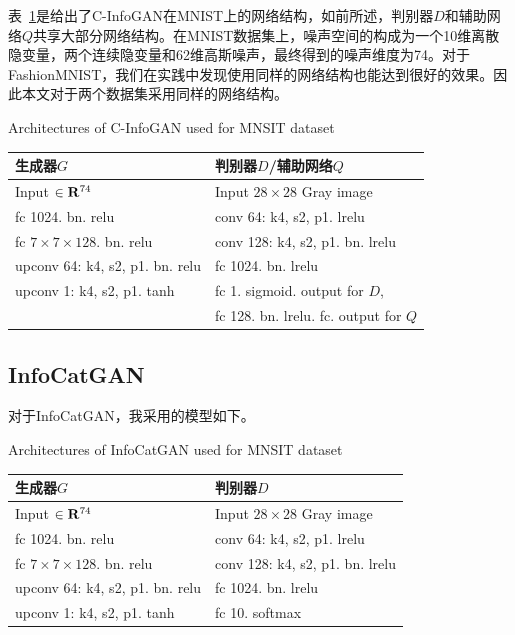 表~\ref{tab:m-cig-netarch}是给出了C-InfoGAN在MNIST上的网络结构，如前所述，判别器$D$和辅助网络$Q$共享大部分网络结构。在MNIST数据集上，噪声空间的构成为一个10维离散隐变量，两个连续隐变量和62维高斯噪声，最终得到的噪声维度为74。对于FashionMNIST，我们在实践中发现使用同样的网络结构也能达到很好的效果。因此本文对于两个数据集采用同样的网络结构。
\begin{table}
  \centering
  {Architectures of C-InfoGAN used for MNSIT dataset}
  \begin{tabular}{l|l}
    \hline
    \textbf{生成器$G$}               & \textbf{判别器$D$/辅助网络$Q$} \\ \hline
    Input $\in \mathbf{R}^{74}$          & Input $28\times 28$ Gray image \\ \hline
    fc 1024. bn. relu                & conv 64: k4, s2, p1. lrelu  \\ \hline
    fc $7\times7\times128$. bn. relu & conv 128: k4, s2, p1. bn. lrelu \\ \hline
    upconv 64: k4, s2, p1. bn. relu  & fc 1024. bn. lrelu \\ \hline
    upconv 1: k4, s2, p1. tanh       & fc 1. sigmoid. output for $D$, \\
    ~                                & fc 128. bn. lrelu. fc. output for $Q$ \\
    \hline
  \end{tabular}
  \label{tab:m-cig-netarch}
\end{table}

\subsection{InfoCatGAN}
对于InfoCatGAN，我采用的模型如下。
\begin{table}
  \centering
  {Architectures of InfoCatGAN used for MNSIT dataset}
  \begin{tabular}{l|l}
    \hline
    \textbf{生成器$G$}               & \textbf{判别器$D$} \\ \hline
    Input $\in \mathbf{R}^{74}$          & Input $28\times 28$ Gray image \\ \hline
    fc 1024. bn. relu                & conv 64: k4, s2, p1. lrelu  \\ \hline
    fc $7\times7\times128$. bn. relu & conv 128: k4, s2, p1. bn. lrelu \\ \hline
    upconv 64: k4, s2, p1. bn. relu  & fc 1024. bn. lrelu \\ \hline
    upconv 1: k4, s2, p1. tanh       & fc 10. softmax \\
    \hline
  \end{tabular}
  \label{tab:m-icg-netarch}
\end{table}

